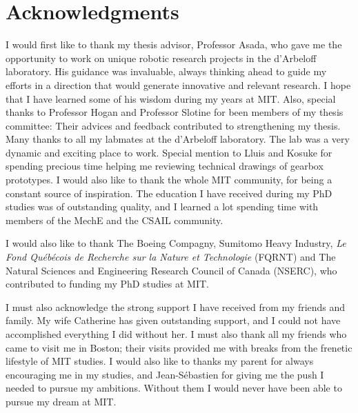 \section*{Acknowledgments}


I would first like to thank my thesis advisor, Professor Asada, who gave me the opportunity to work on unique robotic research projects in the d'Arbeloff laboratory. His guidance was invaluable, always thinking ahead to guide my efforts in a direction that would generate innovative and relevant research. I hope that I have learned some of his wisdom during my years at MIT. Also, special thanks to Professor Hogan and Professor Slotine for been members of my thesis committee: Their advices and feedback contributed to strengthening my thesis. Many thanks to all my labmates at the d'Arbeloff laboratory. The lab was a very dynamic and exciting place to work. Special mention to Lluis and Kosuke for spending precious time helping me reviewing technical drawings of gearbox prototypes. I would also like to thank the whole MIT community, for being a constant source of inspiration. The education I have received during my PhD studies was of outstanding quality, and I learned a lot spending time with members of the MechE and the CSAIL community.

I would also like to thank The Boeing Compagny, Sumitomo Heavy Industry, \textit{Le Fond Qu\'{e}b\'{e}cois de Recherche sur la Nature et Technologie} (FQRNT) and The Natural Sciences and Engineering Research Council of Canada (NSERC), who contributed to funding my PhD studies at MIT.

I must also acknowledge the strong support I have received from my friends and family. My wife Catherine has given outstanding support, and I could not have accomplished everything I did without her. I must also thank all my friends who came to visit me in Boston; their visits provided me with breaks from the frenetic lifestyle of MIT studies. I would also like to thanks my parent for always encouraging me in my studies, and Jean-S\'{e}bastien for giving me the push I needed to pursue my ambitions. Without them I would never have been able to pursue my dream at MIT. 
